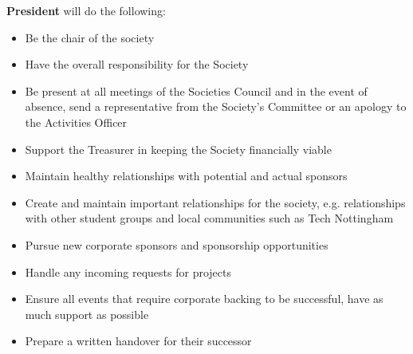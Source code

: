 \begin{subclause}
  \textbf{President} will do the following:
  \begin{itemize}[label=--,topsep=0em,itemsep=0em]
    \item Be the chair of the society
    \item Have the overall responsibility for the Society
    \item Be present at all meetings of the Societies Council and in the event of absence, send a representative from the Society's Committee or an apology to the Activities Officer
    \item Support the Treasurer in keeping the Society financially viable
    \item Maintain healthy relationships with potential and actual sponsors
    \item Create and maintain important relationships for the society, e.g. relationships with other student groups and local communities such as Tech Nottingham
    \item Pursue new corporate sponsors and sponsorship opportunities
    \item Handle any incoming requests for projects
    \item Ensure all events that require corporate backing to be successful, have as much support as possible
    \item Prepare a written handover for their successor
  \end{itemize}
\end{subclause}

